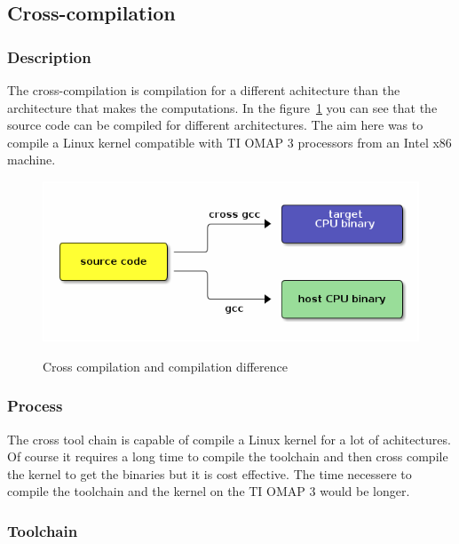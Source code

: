 \documentclass[english,a4paper,11pt]{report}
\begin{document}
	\subsection{Cross-compilation}
	\subsubsection{Description}
	\par The cross-compilation is compilation for a different achitecture than the architecture that makes the computations. In the figure~\ref{cross} you can see that the source code can be compiled for different architectures. The aim here was to compile a Linux kernel compatible with TI OMAP 3 processors from an Intel x86 machine.
	\begin{figure}[h]
		\begin{center}
			\includegraphics[scale=0.5]{images_not_compressed/cross-compile.png}
			\label{cross}
			\caption{Cross compilation and compilation difference}
		\end{center}
	\end{figure}

	\subsubsection{Process}
	\par The cross tool chain is capable of compile a Linux kernel for a lot of achitectures. Of course it requires a long time to compile the toolchain and then cross compile the kernel to get the binaries but it is cost effective. The time necessere to compile the toolchain and the kernel on the TI OMAP 3 would be longer.
	
	\subsubsection{Toolchain}
	
\end{document}
